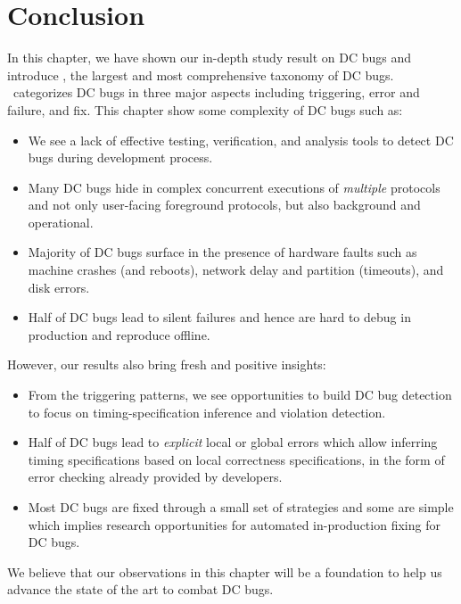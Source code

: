 
\section{Conclusion}

In this chapter, we have shown our in-depth study result on DC bugs and
introduce \taxdc, the largest and most comprehensive taxonomy of DC bugs. 
\taxdc\ categorizes DC bugs in three major aspects including triggering, error
and failure, and fix. This chapter show some complexity of DC bugs such as:

\begin{itemize}
\item We see a lack of effective testing, verification, and analysis tools to
detect DC bugs during development process.

\item Many DC bugs hide in complex concurrent executions of {\em multiple}
protocols and not only user-facing foreground protocols, but also background and
operational.

\item Majority of DC bugs surface in the presence of hardware faults such as
machine crashes (and reboots), network delay and partition (timeouts), and disk
errors.  

\item Half of DC bugs lead to silent failures and hence are hard to debug in
production and reproduce offline.

\end{itemize}


However, our results also bring fresh and positive insights:

\begin{itemize}
\item From the triggering patterns, we see opportunities to build DC bug
detection to focus on timing-specification inference and violation detection.

\item Half of DC bugs lead to {\em explicit} local or global errors which allow
inferring timing specifications based on local correctness specifications, in
the form of error checking already provided by developers.

\item Most DC bugs are fixed through a small set of strategies and some are
simple which implies research opportunities for automated in-production fixing
for DC bugs.


\end{itemize}

We believe that our observations in this chapter will be a foundation to help us
advance the state of the art to combat DC bugs.
